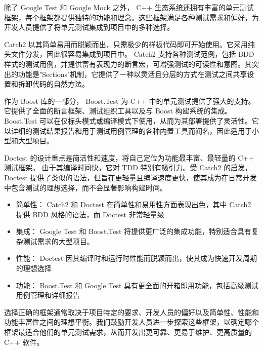 
除了 Google Test 和 Google Mock 之外， C++ 生态系统还拥有丰富的单元测试框架，每个框架都提供独特的功能和理念。这些框架满足各种测试需求和偏好，为开发人员提供了将单元测试集成到项目中的多种选择。


Catch2 以其简单易用而脱颖而出，只需极少的样板代码即可开始使用。它采用纯头文件分发，因此很容易集成到项目中。 Catch2 支持各种测试范例，包括 BDD 样式的测试用例，并提供富有表现力的断言宏，可增强测试的可读性和意图。其突出的功能是"Sections"机制，它提供了一种以灵活且分层的方式在测试之间共享设置和拆卸代码的自然方法。


作为 Boost 库的一部分， Boost.Test 为 C++ 中的单元测试提供了强大的支持。它提供了全面的断言框架、测试组织工具以及与 Boost 构建系统的集成。 Boost.Test 可以在仅标头模式或编译模式下使用，从而为其部署提供了灵活性。它以详细的测试结果报告和用于测试用例管理的各种内置工具而闻名，因此适用于小型和大型项目。


Doctest 的设计重点是简洁性和速度，将自己定位为功能最丰富、最轻量的 C++ 测试框架。
由于其编译时间快，它对 TDD 特别有吸引力。受 Catch2 的启发， Doctest 提供了类似的语法，但旨在更轻量且编译速度更快，使其成为在日常开发中包含测试的理想选择，而不会显著影响构建时间。


\begin{itemize}
\item
简单性： Catch2 和 Doctest 在简单性和易用性方面表现出色，其中 Catch2 提供 BDD 风格的语法，而 Doctest 非常轻量级

\item
集成： Google Test 和 Boost.Test 将提供更广泛的集成功能，特别适合具有复杂测试需求的大型项目。

\item
性能： Doctest 因其编译时和运行时性能而脱颖而出，使其成为快速开发周期的理想选择

\item
功能： Boost.Test 和 Google Test 具有更全面的开箱即用功能，包括高级测试用例管理和详细报告
\end{itemize}

选择正确的框架通常取决于项目特定的要求、开发人员的偏好以及简单性、性能和功能丰富性之间的理想平衡。我们鼓励开发人员进一步探索这些框架，以确定哪个框架最适合他们的单元测试需求，从而开发出更可靠、更易于维护、更高质量的 C++ 软件。

